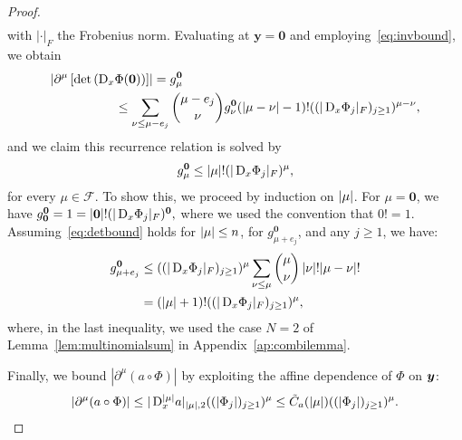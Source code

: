 \begin{proof}
\begin{align*}
    \end{align*}
    with $|\cdot|_F$ the Frobenius norm.
    Evaluating at $\bm{y}=\bm{0}$ and employing~\eqref{eq:invbound}, we obtain
    \begin{align*}
        \left| \partial^\mu \left[ \det\left( \D \Phi(\bm{0}) \right)\right]\right| &= g_\mu^{\bm{0}}\\
        &\hspace{-30pt}\leq \sum_{\nu \leq \mu - e_j}  \binom{\mu - e_j }{ \nu}  g_\nu^{\bm{0}} (|\mu - \nu|-1)!((| \D \Phi_j |_F)_{j\geq 1})^{\mu - \nu},
    \end{align*}
    and we claim this recurrence relation is solved by
    \begin{equation}
        g_\mu^{\bm{0}} \leq \left|\mu\right|!(|\mathop{}\!\mathrm{D}_x \Phi_j|_F)^\mu, \label{eq:detbound}
    \end{equation}
    for every $\mu\in\mathcal{F}$.
    To show this, we proceed by induction on $\left|\mu\right|$.
    For $\mu = \bm{0}$, we have  $g_{\bm{0}}^{\bm{0}} = 1=|\bm{0}|!(|\mathop{}\!\mathrm{D}_x \Phi_j|_F)^{\bm{0}},$ where we used the convention that $0!=1$.
    Assuming~\eqref{eq:detbound} holds for $\left|\mu\right| \leq n$, for $g_{\mu+e_j}^{\bm{0}}$, and any $j\geq 1$, we have:
    \begin{align*}
        g_{\mu+e_j}^{\bm{0}}
        &\leq((| \mathop{}\!\mathrm{D}_x \Phi_j |_F)_{j\geq 1})^{\mu}\sum_{\nu \leq \mu}  \binom{\mu }{ \nu}  \left|\nu\right|! |\mu - \nu|!
        \\&=   (\left|\mu\right|+1)!((| \mathop{}\!\mathrm{D}_x \Phi_j |_F)_{j\geq 1})^{\mu},
    \end{align*}
    where, in the last inequality, we used the case $N=2$ of Lemma~\ref{lem:multinomialsum} in Appendix~\ref{ap:combilemma}.

    Finally, we bound $| \partial^\mu (a \circ \Phi) |$ by exploiting the affine dependence of $\Phi$ on ${\bm{y}}$:
    \begin{align}
        | \partial^\mu ( a \circ \Phi ) | \leq | \mathop{}\!\mathrm{D}_x^{|\mu|} a|_{|\mu|,2}  ((|\Phi_j|)_{j \geq 1})^{\mu}\leq {\tilde{C}_a}(|\mu|)((|\Phi_j|)_{j \geq 1})^{\mu}.\label{eq:gbound}
    \end{align}


\end{proof}
